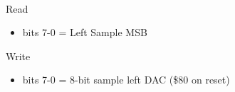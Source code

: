 \\
Read
\begin{itemize}
\item bits 7-0 = \iis Left Sample MSB
\end{itemize}
Write
\begin{itemize}
\item bits 7-0 = 8-bit sample left DAC (\$80 on reset)
\end{itemize}

